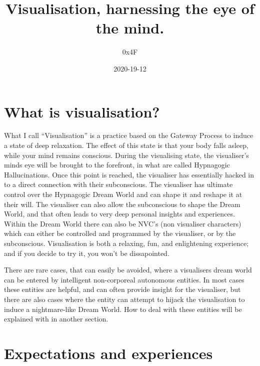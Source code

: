 \documentclass{article}
\title{Visualisation, harnessing the eye of the mind.}
\date{2020-19-12}
\author{0x4F}
\begin{document}
\maketitle
\newpage

\section{What is visualisation?}
What I call ``Visualisation'' is a practice based on the Gateway Process to induce a state of deep relaxation. The effect of this state is that your body falls asleep, while your mind remains conscious. During the visualising state, the visualiser's minds eye will be brought to the forefront, in what are called Hypnagogic Hallucinations. Once this point is reached, the visualiser has essentially hacked in to a direct connection with their subconscious. The visualiser has ultimate control over the Hypnagogic Dream World and can shape it and reshape it at their will. The visualiser can also allow the subconscious to shape the Dream World, and that often leads to very deep personal insights and experiences. Within the Dream World there can also be NVC's (non visualiser characters) which can either be controlled and programmed by the visualiser, or by the subconscious. Visualisation is both a relaxing, fun, and enlightening experience; and if you decide to try it, you won't be dissapointed.

There are rare cases, that can easily be avoided, where a visualisers dream world can be entered by intelligent non-corporeal autonomous entities. In most cases these entities are helpful, and can often provide insight for the visualiser, but there are also cases where the entity can attempt to hijack the visualisation to induce a nightmare-like Dream World. How to deal with these entities will be explained with in another section.


\section{Expectations and experiences}
\end{document}
